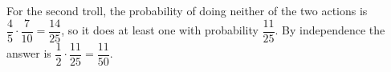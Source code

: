 For the second troll, the probability of doing neither of the two actions is $\dfrac45\cdot\dfrac7{10}=\dfrac{14}{25}$, so it does at least one with probability $\dfrac{11}{25}$. By independence the answer is $\dfrac12\cdot\dfrac{11}{25}=\boxed{\dfrac{11}{50}}$.
